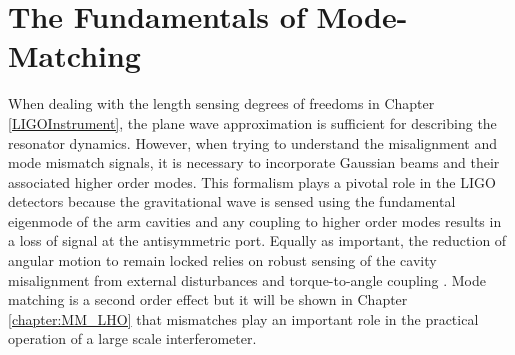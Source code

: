 \chapter{The Fundamentals of Mode-Matching}\label{chap:fund_mm}
		When dealing with the length sensing degrees of freedoms in Chapter \ref{LIGOInstrument}, the plane wave approximation is sufficient for describing the resonator dynamics. However, when trying to understand the misalignment and mode mismatch signals, it is necessary to incorporate Gaussian beams and their associated higher order modes. This formalism plays a pivotal role in the LIGO detectors because the gravitational wave is sensed using the fundamental eigenmode of the arm cavities and any coupling to higher order modes results in a loss of signal at the antisymmetric port.  Equally as important, the reduction of angular motion to remain locked relies on robust sensing of the cavity misalignment from external disturbances \cite{Fritschel_alignment} and torque-to-angle coupling \cite{SiggSidle}.  Mode matching is a second order effect but it will be shown in Chapter \ref{chapter:MM_LHO} that mismatches play an important role in the practical operation of a large scale interferometer.
			
